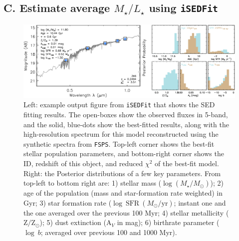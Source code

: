 \documentclass{emulateapj}
\def\logms{{$\log (M_{\star}/M_{\odot})$}}
\begin{document}
\begin{CJK*}{UTF8}{gbsn}
\section{C. Estimate average {$M_{\star}/L_{\star}$} using \texttt{iSEDFit}} 
    \label{app:sed} 

    \begin{figure}[bt!]
        \begin{center}
        \includegraphics[width=\textwidth]{fig/redbcg_isedfit_example.pdf}
        \caption{
            Left: example output figure from \texttt{iSEDFit} that shows the SED 
        	fitting results. 
            The open-boxes show the observed fluxes in 5-band, and the solid, blue-dots
            show the best-fitted results, along with the high-resolution spectrum for
            this model reconstructed using the synthetic spectra from \texttt{FSPS}. 
            Top-left corner shows the best-fit stellar population parameters, and 
            bottom-right corner shows the ID, redshift of this object, and reduced 
            $\chi^2$ of the best-fit model.~~~
            Right: the Posterior distributions of a few key parameters.
            From top-left to bottom right are: 1) stellar mass (\logms{}); 2) age of the 
            population (mass and star-formation rate weighted) in Gyr; 3) star formation 
            rate ($\log\ \mathrm{SFR}\ (M_{\odot}/\mathrm{yr})$; instant one and the one 
            averaged over the previous 100 Myr; 4) stellar metallicity 
            ($\mathrm{Z}/\mathrm{Z}_{\odot}$); 5) dust extinction ($\mathrm{A}_V$ in mag);
            6) birthrate parameter ($\log\ b$; averaged over previous 100 and 1000 Myr).
            }
        \label{fig:ised}
        \end{center}
    \end{figure}


\end{CJK*}
\end{document}
